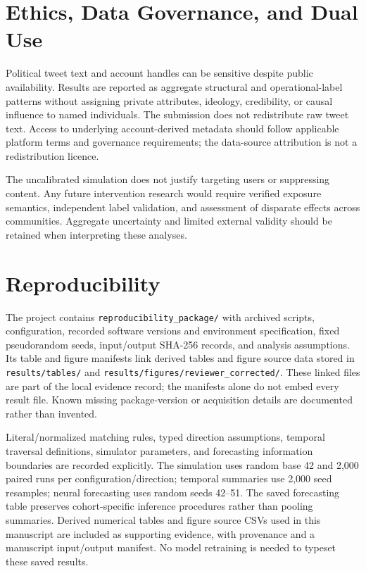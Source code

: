 \documentclass[11pt,a4paper]{article}
\begin{document}
\section{Ethics, Data Governance, and Dual Use}
Political tweet text and account handles can be sensitive despite public availability. Results are reported as aggregate structural and operational-label patterns without assigning private attributes, ideology, credibility, or causal influence to named individuals. The submission does not redistribute raw tweet text. Access to underlying account-derived metadata should follow applicable platform terms and governance requirements; the data-source attribution is not a redistribution licence.

The uncalibrated simulation does not justify targeting users or suppressing content. Any future intervention research would require verified exposure semantics, independent label validation, and assessment of disparate effects across communities. Aggregate uncertainty and limited external validity should be retained when interpreting these analyses.

\section{Reproducibility}
The project contains \texttt{reproducibility\_package/} with archived scripts, configuration, recorded software versions and environment specification, fixed pseudorandom seeds, input/output SHA-256 records, and analysis assumptions. Its table and figure manifests link derived tables and figure source data stored in \texttt{results/tables/} and \texttt{results/figures/reviewer\_corrected/}. These linked files are part of the local evidence record; the manifests alone do not embed every result file. Known missing package-version or acquisition details are documented rather than invented.

Literal/normalized matching rules, typed direction assumptions, temporal traversal definitions, simulator parameters, and forecasting information boundaries are recorded explicitly. The simulation uses random base 42 and 2,000 paired runs per configuration/direction; temporal summaries use 2,000 seed resamples; neural forecasting uses random seeds 42--51. The saved forecasting table preserves cohort-specific inference procedures rather than pooling summaries. Derived numerical tables and figure source CSVs used in this manuscript are included as supporting evidence, with provenance and a manuscript input/output manifest. No model retraining is needed to typeset these saved results.
\end{document}
